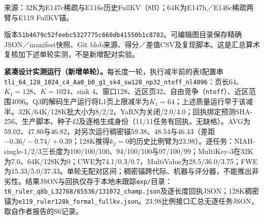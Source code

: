 \documentclass[10pt,letterpaper]{article}
\begin{document}
\par\medskip\noindent 来源：32K为E147c稀疏与E116e历史FullKV（8B）；64K为E147h／E146c稀疏两臂与E119 FullKV锚。\par\noindent 版本\texttt{51b4679c\allowbreak{}52feebc5\allowbreak{}327775c6\allowbreak{}60db4155\allowbreak{}0b1c8782}。可编辑图目录保存精确JSON／manifest快照、Git blob来源、得分／差值CSV及复现脚本。这是汇总算术复核加下述单轮实测，不是新增配对实验。

\par\medskip\noindent\textbf{紧凑设计实测运行（新增单轮）。}每长度一轮，执行减半前的表I配置串\texttt{tli\_64\_128\_1024\_c4\_\allowbreak Aa0\_b0\_g1\_\allowbreak sk4\_sw128\_\allowbreak np32\_ntoff\_nl4096}：页长64、$K_1{=}128$、$K{=}1024$、sink 4、窗口128、近区页32、自由竞争（\texttt{ntoff}）、近区范围4096。Q3的解码生产运行将L1页上限减半为$K_1{=}64$；上述质量运行早于该减半。32K/64K/128K批大小为8/2/2，YaRN为关闭/2.0/4.0；回执绑定预测SHA-256、生产脚本、种子42及逐格生成身份（11/11任务有回执，无缺格）。AVG为59.02、47.80与46.82，对另次运行稠密锚59.38、48.54与46.43（差距$-0.36/-0.74/+0.39$；128K推得$k_f=0$的历史比例臂为23.98）。逐任务：NIAH-single-1/2/3三长度为100/100/100、94/100/100与97/100/99；MultiKey-3在32K为7.0、64K/128K为0；CWE为74.1/0.3/0.7，MultiValue为28.5/36.0/3.75；FWE为15.33/5.0/37.33。单轮无配对区间；稠密锚跨代际、机器与评分器，不能推出非劣性。结果JSON与回执仅存于本地未跟踪\texttt{exp/}目录：\texttt{t6\_\allowbreak ruler\_\allowbreak q8b\_\allowbreak L32768/65536/131072\_\allowbreak champ.json}及逐长度回执JSON；128K稠密锚为\texttt{e119\_\allowbreak ruler128k\_\allowbreak formal\_\allowbreak fullkv.json}。23.98比例接口汇总无逐任务JSON，取自作者报告的S6记录。
\end{document}
